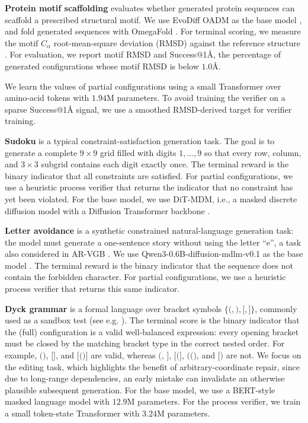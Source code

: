 \documentclass{article}
\numberwithin{theorem}{section}
\numberwithin{proposition}{section}
\numberwithin{corollary}{section}
\numberwithin{lemma}{section}
\numberwithin{conjecture}{section}
\numberwithin{remark}{section}
\numberwithin{definition}{section}
\numberwithin{assumption}{section}
\numberwithin{example}{section}
\begin{document}
\textbf{Protein motif scaffolding} evaluates whether generated protein
sequences can scaffold a prescribed structural motif. We use EvoDiff OADM as
the base model \citep{alamdari2023protein}, and fold generated
sequences with OmegaFold \citep{wu2022omegafold}. For terminal scoring, we measure the motif \(C_\alpha\) root-mean-square deviation (RMSD) against the reference structure \citep{MAIOROV1994625}. For evaluation, we report motif RMSD and Success@1\AA{}, the percentage of generated configurations whose motif RMSD is below \(1.0\text{\AA}\).

We learn the values of partial configurations using a small Transformer over amino-acid tokens with $1.94$M parameters. To avoid training the verifier on a sparse Success@1\AA{} signal, we use a smoothed RMSD-derived target for verifier training.




\textbf{Sudoku} is a typical constraint-satisfaction generation task. The goal is to
generate a complete \(9\times9\) grid filled with digits \(1,\ldots,9\) so that every row,
column, and \(3\times3\) subgrid contains each digit exactly once. The terminal reward is the binary indicator that all constraints are satisfied. For partial configurations, we use a heuristic process verifier that returns the indicator that no constraint has yet been violated. For the base model, we use DiT-MDM, i.e., a masked discrete diffusion model
\citep{sahoo2024simple} with a Diffusion Transformer backbone
\citep{peebles2023scalable}.

\textbf{Letter avoidance} is a synthetic constrained natural-language generation task:
the model must generate a one-sentence story without using the letter
``e'', a task also considered in AR-VGB \citep{rohatgi2025taming}. We use Qwen3-0.6B-diffusion-mdlm-v0.1 as the base model
\cite{qwen3_06b_diffusion_mdlm}. The terminal reward is the binary indicator that the sequence does not contain
the forbidden character. For partial configurations, we use a heuristic process verifier that returns this same indicator.

\textbf{Dyck grammar} is a formal language over bracket symbols
\(\{\texttt{(},\texttt{)},\texttt{[},\texttt{]}\}\), commonly used as a sandbox test (see e.g. \cite{rohatgi2025taming}). The terminal score is the binary indicator that the (full) configuration is a valid well-balanced expression: every opening
bracket must be closed by the matching bracket type in the correct nested
order. For example, \(\texttt{()}\), \(\texttt{[]}\), and \(\texttt{[()]}\) are
valid, whereas \(\texttt{(}\), \(\texttt{]}\), \(\texttt{[(]}\),
\(\texttt{(()}\), and \(\texttt{[)}\) are not. We focus on the editing task, which highlights the benefit
of arbitrary-coordinate repair, since due to long-range dependencies, an early mistake can invalidate an otherwise plausible subsequent generation. For the base model, we use a BERT-style masked language model with $12.9$M parameters. For the process verifier, we train a small token-state Transformer with $3.24$M parameters.
\end{document}
